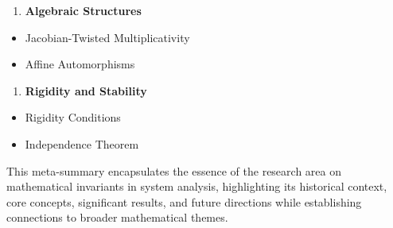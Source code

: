 \documentclass[11pt,a4paper]{article}
\begin{document}
\begin{enumerate}
\item \textbf{Algebraic Structures}
\end{enumerate}
\begin{itemize}
\item Jacobian-Twisted Multiplicativity
\item Affine Automorphisms
\end{itemize}

\begin{enumerate}
\item \textbf{Rigidity and Stability}
\end{enumerate}
\begin{itemize}
\item Rigidity Conditions
\item Independence Theorem
\end{itemize}

This meta-summary encapsulates the essence of the research area on mathematical invariants in system analysis, highlighting its historical context, core concepts, significant results, and future directions while establishing connections to broader mathematical themes.
\end{document}

